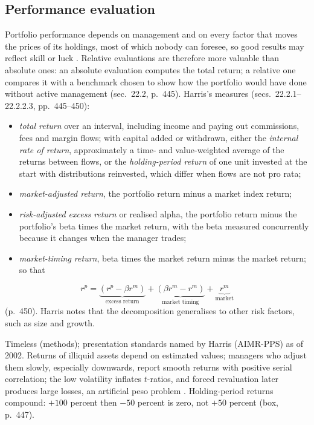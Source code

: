 \subsection{Performance evaluation}

\begin{qfmethod}\label{meth:relative-performance-evaluation}
 Portfolio performance depends on management and on every factor that moves the prices of its holdings, most of which nobody can foresee, so good results may reflect skill or luck \citep[chap.~``Performance Evaluation and Prediction'', sec.~22.1, pp.~443--444]{alpha-harris}. Relative evaluations are therefore more valuable than absolute ones: an absolute evaluation computes the total return; a relative one compares it with a benchmark chosen to show how the portfolio would have done without active management (sec.~22.2, p.~445). Harris's measures (secs.~22.2.1--22.2.2.3, pp.~445--450):
\begin{itemize}
\item \emph{total return} over an interval, including income and paying out commissions, fees and margin flows; with capital added or withdrawn, either the \emph{internal rate of return}, approximately a time- and value-weighted average of the returns between flows, or the \emph{holding-period return} of one unit invested at the start with distributions reinvested, which differ when flows are not pro rata;
\item \emph{market-adjusted return}, the portfolio return minus a market index return;
\item \emph{risk-adjusted excess return} or realised alpha, the portfolio return minus the portfolio's beta times the market return, with the beta measured concurrently because it changes when the manager trades;
\item \emph{market-timing return}, beta times the market return minus the market return; so that
\end{itemize}
\[ r^p=\underbrace{(r^p-\beta r^m)}_{\text{excess return}}+\underbrace{(\beta r^m-r^m)}_{\text{market timing}}+\underbrace{r^m}_{\text{market}} \]
(p.~450). Harris notes that the decomposition generalises to other risk factors, such as size and growth.

 Timeless (methods); presentation standards named by Harris (AIMR-PPS) as of 2002. Returns of illiquid assets depend on estimated values; managers who adjust them slowly, especially downwards, report smooth returns with positive serial correlation; the low volatility inflates $t$-ratios, and forced revaluation later produces large losses, an artificial peso problem \citep[same chap., box ``Smooth Sailing, Rapids Ahead'', p.~448, and sec.~22.5.2.1, pp.~469--470]{alpha-harris}. Holding-period returns compound: $+100$ percent then $-50$ percent is zero, not $+50$ percent (box, p.~447).


\end{qfmethod}
